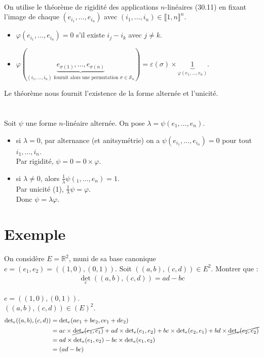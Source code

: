 \documentclass[../main.tex]{subfiles}
\begin{document}
 \\
On utilise le théorème de rigidité des applications $n$-linéaires (30.11) en fixant l'image de chaque $(e_{i_1}, \ldots, e_{i_n})$ avec $(i_1, \ldots, i_n)\in \llbracket 1, n \rrbracket^n$. 
\begin{itemize}
    \item $\varphi(e_{i_1}, \ldots, e_{i_n}) = 0$ s'il existe $i_j - i_k$ avec $j\neq k$.
    \item $\varphi(\underbrace{e_{\sigma(1)}, \ldots, e_{\sigma(n)}}_{(i_1, \ldots, i_n) \text{ fournit alors une permutation }\sigma\in \mathcal{S}_n}) = \varepsilon(\sigma) \times \underbrace{1}_{\varphi(e_1, \ldots, e_n)}$.
\end{itemize}
Le théorème nous fournit l'existence de la forme alternée et l'unicité. \\ \\

 \\
Soit $\psi$ une forme $n$-linéaire alternée. On pose $\lambda = \psi(e_1, \ldots, e_n)$. 
\begin{itemize}
    \item si $\lambda = 0$, par alternance (et anitsymétrie) on a $\psi(e_{i_1}, \ldots, e_{i_n}) = 0$ pour tout $i_1, \ldots, i_n$. \\
    Par rigidité, $\psi = 0 = 0\times \varphi$. 
    \item si $\lambda\neq 0$, alors $\frac{1}{\lambda}\psi(_1, \ldots, e_n) = 1$. \\
    Par unicité (1), $\frac{1}{\lambda}\psi = \varphi$. \\
    Donc $\psi = \lambda\varphi$.
\end{itemize}

\section{Exemple}
\begin{tcolorbox}[title=Exemple 30.25, title filled=false, colframe=darkgreen, colback=darkgreen!10!white]
    On considère $E = \mathbb{R}^2$, muni de sa base canonique $e = (e_1, e_2) = ((1, 0), (0, 1))$. Soit $((a, b), (c, d))\in E^2$. Montrer que : 
    \begin{align*}
        \underset{e}{\operatorname{det}}((a, b), (c, d))= ad - bc
    \end{align*}
\end{tcolorbox}

\noindent $e = ((1, 0), (0, 1))$. \\
$((a, b), (c, d))\in (E)^2$. 
\begin{align*}
    \operatorname{det}_e((a, b), (c, d)) &= \operatorname{det}_e(ae_1 + be_2, ce_1 + de_2) \\
    &= ac\times \cancel{\operatorname{det}_e(e_1, e_1)} + ad\times \operatorname{det}_e(e_1, e_2) + bc\times \operatorname{det}_e(e_2, e_1) + bd\times \cancel{\operatorname{det}_e(e_2, e_2)} \\
    &= ad \times \operatorname{det}_e(e_1, e_2) - bc \times \operatorname{det}_e(e_1, e_2) \\
    &= (ad - bc)
\end{align*}
\end{document}
